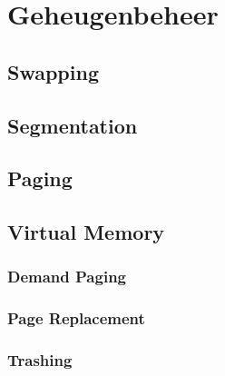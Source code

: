 \chapter{Geheugenbeheer}

\section{Swapping}

\section{Segmentation}

\section{Paging}

\section{Virtual Memory}

\subsection{Demand Paging}

\subsection{Page Replacement}

\subsection{Trashing}
